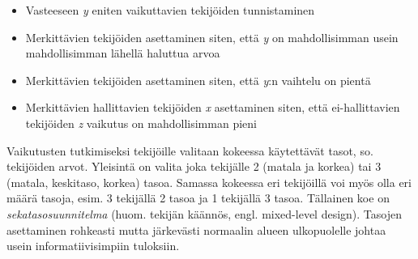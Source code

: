 \documentclass[12pt,a4paper,finnish]{tutthesis}
\begin{document}
\begin{itemize}
\item Vasteeseen \textit{y} eniten vaikuttavien tekijöiden tunnistaminen
\item Merkittävien tekijöiden asettaminen siten, että \textit{y} on mahdollisimman usein
	mahdollisimman lähellä haluttua arvoa
\item Merkittävien tekijöiden asettaminen siten, että \textit{y}:n vaihtelu on pientä
\item Merkittävien hallittavien tekijöiden \textit{x} asettaminen siten, että
	ei-hallittavien tekijöiden \textit{z} vaikutus on mahdollisimman pieni
\end{itemize}

Vaikutusten tutkimiseksi tekijöille valitaan kokeessa käytettävät tasot, so.
tekijöiden arvot. Yleisintä on valita joka tekijälle 2 (matala ja korkea) tai
3 (matala, keskitaso, korkea) tasoa.
Samassa kokeessa eri tekijöillä voi myös olla eri määrä tasoja, esim. 3 tekijällä
2 tasoa ja 1 tekijällä 3 tasoa. Tällainen koe on
\textit{sekatasosuunnitelma} (huom. tekijän käännös, engl.
mixed-level design).
Tasojen asettaminen rohkeasti mutta
järkevästi normaalin alueen ulkopuolelle johtaa usein informatiivisimpiin
tuloksiin.

%
%
%
\end{document}
